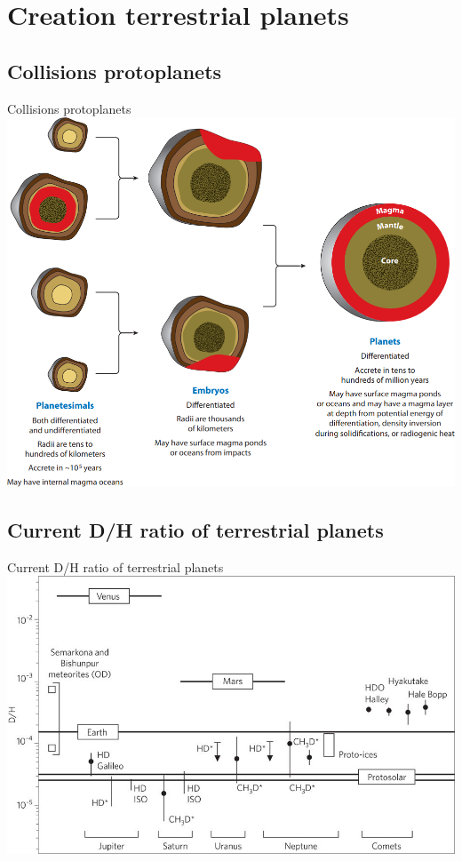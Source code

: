\documentclass[11pt, aspectratio=169]{beamer}
\begin{document}
\section{Creation terrestrial planets}
\subsection{Collisions protoplanets}
\begin{frame}[t]{Collisions protoplanets}
	\centering
	\includegraphics[height=1\textheight]{figures/protoplanets.png}
\end{frame}


\subsection{Current D/H ratio of terrestrial planets}
\begin{frame}[t]{Current D/H ratio of terrestrial planets}
	\centering
	\includegraphics[height=.7\textheight]{figures/dh-ratio-terrestrial-planets.jpg}
\end{frame}
\end{document}
